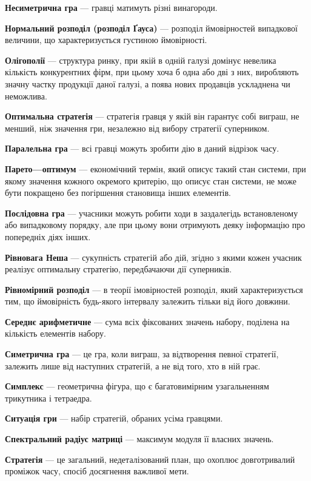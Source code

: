 \documentclass[a4paper]{article}
\begin{document}
\textbf{Несиметрична гра} — гравці матимуть різні винагороди.

\textbf{Нормальний розподіл (розподіл Ґауса)} — розподіл ймовірностей випадкової величини, що характеризується густиною ймовірності.

\textbf{Олігополії} — структура ринку, при якій в одній галузі домінує невелика кількість конкурентних фірм, при цьому хоча б одна або дві з них, виробляють значну частку продукції даної галузі, а поява нових продавців ускладнена чи неможлива.

\textbf{Оптимальна стратегія} — стратегія гравця у якій він гарантує собі виграш, не менший, ніж значення гри, незалежно від вибору стратегії суперником.

\textbf{Паралельна гра} — всі гравці можуть зробити дію в даний відрізок часу.

\textbf{Парето—оптимум} — економічний термін, який описує такий стан системи, при якому значення кожного окремого критерію, що описує стан системи, не може бути покращено без погіршення становища інших елементів.

\textbf{Послідовна гра} — учасники можуть робити ходи в заздалегідь встановленому або випадковому порядку, але при цьому вони отримують деяку інформацію про попередніх діях інших.

\textbf{Рівновага Неша} — сукупність стратегій або дій, згідно з якими кожен учасник реалізує оптимальну стратегію, передбачаючи дії суперників.

\textbf{Рівномірний розподіл} — в теорії імовірностей розподіл, який характеризується тим, що ймовірність будь-якого інтервалу залежить тільки від його довжини.

\textbf{Середнє арифметичне} — сума всіх фіксованих значень набору, поділена на кількість елементів набору.

\textbf{Симетрична гра} — це гра, коли виграш, за відтворення певної стратегії, залежить лише від наступних стратегій, а не від того, хто в ній грає.

\textbf{Симплекс} — геометрична фігура, що є багатовимірним узагальненням трикутника і тетраедра. 

\textbf{Ситуація гри} — набір стратегій, обраних усіма гравцями.

\textbf{Спектральний радіус матриці} — максимум модуля її власних значень.

\textbf{Стратегія} —  це загальний, недеталізований план, що охоплює довготривалий проміжок часу, спосіб досягнення важливої мети.
\end{document}
